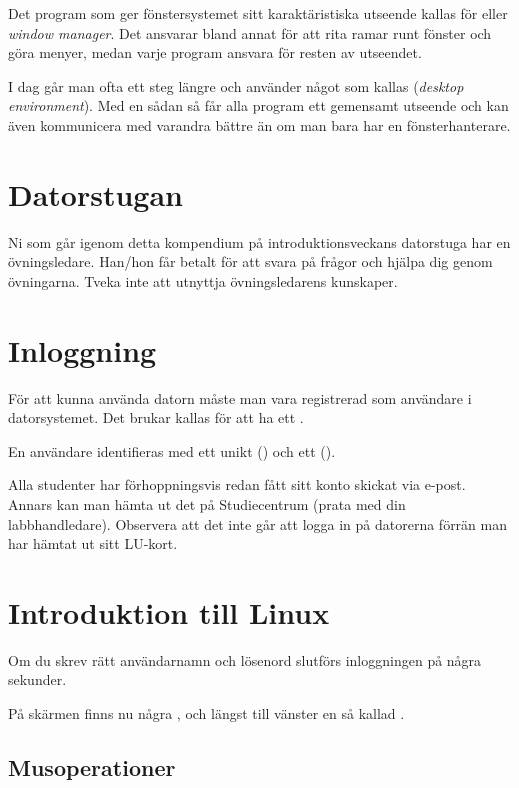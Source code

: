 \documentclass[a4paper,twocolumn]{book}
\begin{document}
Det program som ger fönstersystemet sitt karaktäristiska utseende
kallas för  eller \emph{window manager}. Det
ansvarar bland annat för att rita ramar runt fönster och göra menyer, medan
varje program ansvara för resten av utseendet.

I dag går man ofta ett steg längre och använder något som kallas
 (\emph{desktop environment}). Med en sådan så får
alla program ett gemensamt utseende och kan även kommunicera med varandra
bättre än om man bara har en fönsterhanterare.

\section{Datorstugan}

Ni som går igenom detta kompendium på introduktionsveckans datorstuga
har en övningsledare. Han/hon får betalt för att svara på frågor och
hjälpa dig genom övningarna. Tveka inte att utnyttja övningsledarens
kunskaper. 


\section{Inloggning}

För att kunna använda datorn måste man vara registrerad som användare
i datorsystemet. Det brukar kallas för att ha ett .

En användare identifieras med ett unikt 
() och ett  ().

Alla studenter har förhoppningsvis redan fått sitt konto skickat via e-post. Annars
kan man hämta ut det på Studiecentrum (prata med din labbhandledare). Observera att det inte går att logga in
på datorerna förrän man har hämtat ut sitt LU-kort.


\section{Introduktion till Linux}

Om du skrev rätt användarnamn och lösenord slutförs inloggningen på några
sekunder.

På skärmen finns nu några , och längst till vänster  en så kallad
.


\subsection{Musoperationer} %
\end{document}
